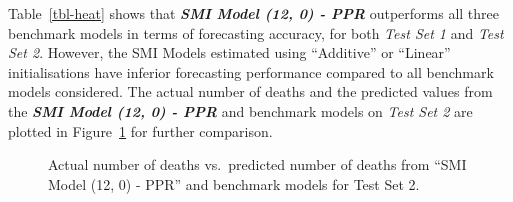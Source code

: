 \documentclass[
  11pt,
  a4paper,
]{article}
\begin{document}
\begin{table}

\caption{\label{tbl-heat}Daily mortality forecasting - Out-of-sample
point forecast results.}


\end{table}%

Table~\ref{tbl-heat} shows that \textbf{\emph{SMI Model (12, 0) - PPR}}
outperforms all three benchmark models in terms of forecasting accuracy,
for both \emph{Test Set 1} and \emph{Test Set 2}. However, the SMI
Models estimated using ``Additive'' or ``Linear'' initialisations have
inferior forecasting performance compared to all benchmark models
considered. The actual number of deaths and the predicted values from
the \textbf{\emph{SMI Model (12, 0) - PPR}} and benchmark models on
\emph{Test Set 2} are plotted in Figure~\ref{fig-heatPred} for further
comparison.

\begin{figure}


\caption{\label{fig-heatPred}Actual number of deaths vs.~predicted
number of deaths from ``SMI Model (12, 0) - PPR'' and benchmark models
for Test Set 2.}

\end{figure}%
\end{document}
